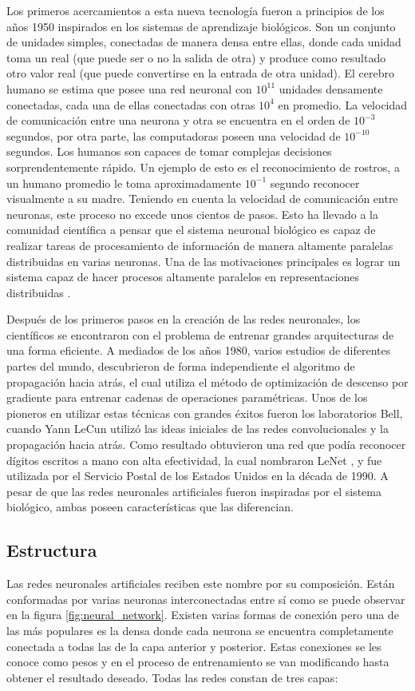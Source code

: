 Los primeros acercamientos a esta nueva tecnología fueron a principios de los a\~nos 1950 inspirados en los sistemas de aprendizaje biológicos. Son un conjunto de unidades simples, conectadas de manera densa entre ellas, donde cada unidad toma un real (que puede ser o no la salida de otra) y produce como resultado otro valor real (que puede convertirse en la entrada de otra unidad). El cerebro humano se estima que posee una red neuronal con $10^{11}$ unidades densamente conectadas, cada una de ellas conectadas con otras $10^{4}$ en promedio. La velocidad de comunicación entre una neurona y otra se encuentra en el orden de $10^{-3}$ segundos, por otra parte, las computadoras poseen una velocidad de $10^{-10}$ segundos. Los humanos son capaces de tomar complejas decisiones sorprendentemente rápido. Un ejemplo de esto es el reconocimiento de rostros, a un humano promedio le toma aproximadamente $10^{-1}$ segundo reconocer visualmente a su madre. Teniendo en cuenta la velocidad de comunicación entre neuronas, este proceso no excede unos cientos de pasos. Esto ha llevado a la comunidad científica a pensar que el sistema neuronal biológico es capaz de realizar tareas de procesamiento de información de manera altamente paralelas distribuidas en varias neuronas. Una de las motivaciones principales es lograr un sistema capaz de hacer procesos altamente paralelos en representaciones distribuidas \cite{brown1990learning,churchland1992computational,mitchell1997machine}.

Después de los primeros pasos en la creación de las redes neuronales, los científicos se encontraron con el problema de entrenar grandes arquitecturas de una forma eficiente. A mediados de los a\~nos 1980, varios estudios de diferentes partes del mundo, descubrieron de forma independiente el algoritmo de propagación hacia atrás, el cual utiliza el método de optimizaci\'on de descenso por gradiente para entrenar cadenas de operaciones param\'etricas. Unos de los pioneros en utilizar estas técnicas con grandes éxitos fueron los laboratorios Bell, cuando Yann LeCun utilizó las ideas iniciales de las redes convolucionales y la propagación hacia atrás. Como resultado obtuvieron una red que podía reconocer dígitos escritos a mano con alta efectividad, la cual nombraron LeNet \cite{lecun1995comparison}, y fue utilizada por el Servicio Postal de los Estados Unidos en la década de 1990. A pesar de que las redes neuronales artificiales fueron inspiradas por el sistema biológico, ambas poseen características que las diferencian.

\subsection{Estructura}
Las redes neuronales artificiales reciben este nombre por su composición. Están conformadas por varias neuronas interconectadas entre s\'i como se puede observar en la figura \ref{fig:neural_network}. Existen varias formas de conexión pero una de las más populares es la densa donde cada neurona se encuentra completamente conectada a todas las de la capa anterior y posterior. Estas conexiones se les conoce como pesos y en el proceso de entrenamiento se van modificando hasta obtener el resultado deseado. Todas las redes constan de tres capas:

